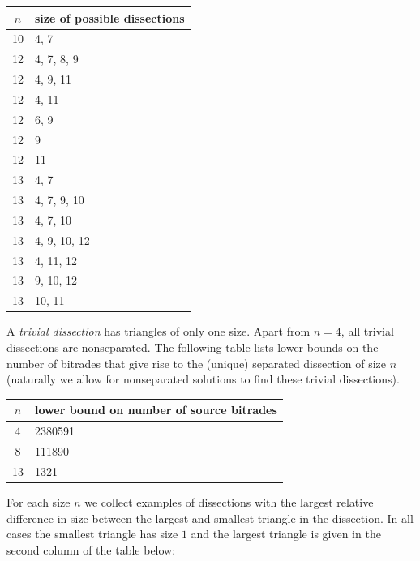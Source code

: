 \documentclass[12pt,amstags,fleqn]{article}
\theoremstyle{plain}
\theoremstyle{definition}
\begin{document}
\begin{center}
\begin{tabular}{|c|l|}
\hline
$n$ & size of possible dissections \\
\hline
\hline 10 & 4, 7  \\
\hline 12 & 4, 7, 8, 9  \\
\hline 12 & 4, 9, 11  \\
\hline 12 & 4, 11  \\
\hline 12 & 6, 9  \\
\hline 12 & 9  \\
\hline 12 & 11  \\
\hline 13 & 4, 7  \\
\hline 13 & 4, 7, 9, 10  \\
\hline 13 & 4, 7, 10  \\
\hline 13 & 4, 9, 10, 12  \\
\hline 13 & 4, 11, 12  \\
\hline 13 & 9, 10, 12  \\
\hline 13 & 10, 11  \\
\hline
\end{tabular}
\end{center}

A {\em trivial dissection} has triangles of only one size. Apart from
$n = 4$, all trivial dissections are nonseparated.  The following
table lists lower bounds on the number of bitrades that give rise to
the (unique) separated dissection of size $n$ (naturally we allow for
nonseparated solutions to find these trivial dissections).

\begin{center}
\begin{tabular}{|c|l|}
\hline
$n$ & lower bound on number of source bitrades \\
\hline
\hline 4 & 2380591 \\
\hline 8 & 111890 \\
\hline 13 & 1321 \\ 
\hline
\end{tabular}
\end{center}

For each size $n$ we collect examples of dissections with the largest
relative difference in size between the largest and smallest triangle in
the dissection. In all cases the smallest triangle has size $1$ and the
largest triangle  is given in the second column of the table below:
\end{document}
